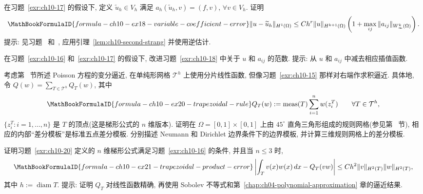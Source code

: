 \begin{MBExercise}
\label{exr:ch10-18}
在习题~\ref{exr:ch10-17} 的假设下, 定义 $\widetilde u_h\in V_h$ 满足 $a_h(\widetilde u_h,v)=(f,v)$, $\forall v\in V_h$. 证明
\[
\MathBookFormulaID{formula-ch10-ex18-variable-coefficient-error}
\|u-\widetilde u_h\|_{H^1(\Omega)}
\leq Ch^r\|u\|_{H^{k+1}(\Omega)}
\left(1+\max_{ij}\|a_{ij}\|_{W_\infty^k(\Omega)}\right).
\]
提示: 见习题~ 和~, 应用引理~\ref{lem:ch10-second-strang} 并使用逆估计.
\end{MBExercise}

\begin{MBExercise}
\label{exr:ch10-19}
在习题~\ref{exr:ch10-16} 和~\ref{exr:ch10-17} 的假设下, 改进习题~\ref{exr:ch10-18} 中关于 $u$ 和 $a_{ij}$ 的范数. 提示: 从 $u$ 和 $a_{ij}$ 中减去相应插值函数.
\end{MBExercise}

\begin{MBExercise}
\label{exr:ch10-20}
考虑第~ 节所述 Poisson 方程的变分逼近, 在单纯形网格 $\mathcal T^h$ 上使用分片线性函数, 但像习题~\ref{exr:ch10-15} 那样对右端作求积逼近. 具体地, 令 $Q(w)=\sum_{T\in\mathcal T^h}Q_T(w)$, 其中
\[
\MathBookFormulaID{formula-ch10-ex20-trapezoidal-rule}
Q_T(w):=\operatorname{meas}(T)\sum_{i=1}^nw(z_i^T)
\qquad\forall T\in\mathcal T^h,
\]
$\{z_i^T:i=1,\ldots,n\}$ 是 $T$ 的顶点(这是梯形公式的 $n$ 维版本). 证明在 $\Omega=[0,1]\times[0,1]$ 上由 $45^\circ$ 直角三角形组成的规则网格(参见第~ 节), 相应的内部``差分模板''是标准五点差分模板. 分别描述 Neumann 和 Dirichlet 边界条件下的边界模板, 并计算三维规则网格上的差分模板.
\end{MBExercise}

\begin{MBExercise}
\label{exr:ch10-21}
证明习题~\ref{exr:ch10-20} 定义的 $n$ 维梯形公式满足习题~\ref{exr:ch10-16} 的条件, 并且当 $n\leq3$ 时,
\[
\MathBookFormulaID{formula-ch10-ex21-trapezoidal-product-error}
\left|\int_Tv(x)w(x)\,dx-Q_T(vw)\right|
\leq Ch^2\|v\|_{H^2(T)}\|w\|_{H^2(T)},
\]
其中 $h:=\operatorname{diam}T$. 提示: 证明 $Q_T$ 对线性函数精确, 再使用 Sobolev 不等式和第~\ref{chap:ch04-polynomial-approximation} 章的逼近结果.
\end{MBExercise}

